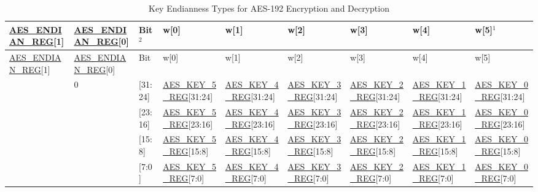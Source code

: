 \documentclass[main\_\_EN.tex]{subfiles}
\begin{document}
\begin{landscape}
\begin{tiny}
\begin{longtable}[c]
{ |p{1.5cm}|p{1.5cm}|p{0.5cm}|p{1.8cm}|p{1.8cm}|p{1.8cm}|p{1.8cm}|p{1.8cm}|p{1.8cm}|}
\caption{Key Endianness Types for AES-192 Encryption and Decryption}\label{table:AES192KeyEndian}\\
\hline
\rowcolor{lightgray}
\hyperref[regdesc:AESENDIANREG]{AES\_ENDIAN\_REG}[1]    &   \hyperref[regdesc:AESENDIANREG]{AES\_ENDIAN\_REG}[0]    &   Bit$^2$ &   w[0]    &   w[1]    &   w[2]    &   w[3]    &   w[4]    &   w[5]$^1$    \\\hline
\endfirsthead
\hline
\rowcolor{lightgray}
\hyperref[regdesc:AESENDIANREG]{AES\_ENDIAN\_REG}[1]    &   \hyperref[regdesc:AESENDIANREG]{AES\_ENDIAN\_REG}[0]    &   Bit &   w[0]    &   w[1]    &   w[2]    &   w[3]    &   w[4]    &   w[5]    \\\hline
\endhead
\endfoot
\multirow{4}{4cm}{0}    &   \multirow{4}{4cm}{0}    &   [31:24]     &   \hyperref[regdesc:AESKEYnREG]{AES\_KEY\_5\_REG}[31:24]  &   \hyperref[regdesc:AESKEYnREG]{AES\_KEY\_4\_REG}[31:24]  &   \hyperref[regdesc:AESKEYnREG]{AES\_KEY\_3\_REG}[31:24]  &   \hyperref[regdesc:AESKEYnREG]{AES\_KEY\_2\_REG}[31:24]  & \hyperref[regdesc:AESKEYnREG]{AES\_KEY\_1\_REG}[31:24]    &   \hyperref[regdesc:AESKEYnREG]{AES\_KEY\_0\_REG}[31:24]\\
\cline{3-9}
&&  [23:16]     &   \hyperref[regdesc:AESKEYnREG]{AES\_KEY\_5\_REG}[23:16]  &   \hyperref[regdesc:AESKEYnREG]{AES\_KEY\_4\_REG}[23:16]  &   \hyperref[regdesc:AESKEYnREG]{AES\_KEY\_3\_REG}[23:16]  &   \hyperref[regdesc:AESKEYnREG]{AES\_KEY\_2\_REG}[23:16]  &   \hyperref[regdesc:AESKEYnREG]{AES\_KEY\_1\_REG}[23:16]  &   \hyperref[regdesc:AESKEYnREG]{AES\_KEY\_0\_REG}[23:16]\\
\cline{3-9}
&&  [15:8]  &   \hyperref[regdesc:AESKEYnREG]{AES\_KEY\_5\_REG}[15:8]   &   \hyperref[regdesc:AESKEYnREG]{AES\_KEY\_4\_REG}[15:8]   &   \hyperref[regdesc:AESKEYnREG]{AES\_KEY\_3\_REG}[15:8]   &   \hyperref[regdesc:AESKEYnREG]{AES\_KEY\_2\_REG}[15:8]   &   \hyperref[regdesc:AESKEYnREG]{AES\_KEY\_1\_REG}[15:8]   &   \hyperref[regdesc:AESKEYnREG]{AES\_KEY\_0\_REG}[15:8]\\
\cline{3-9}
&&  [7:0]   &   \hyperref[regdesc:AESKEYnREG]{AES\_KEY\_5\_REG}[7:0]    &   \hyperref[regdesc:AESKEYnREG]{AES\_KEY\_4\_REG}[7:0]    &   \hyperref[regdesc:AESKEYnREG]{AES\_KEY\_3\_REG}[7:0]    &   \hyperref[regdesc:AESKEYnREG]{AES\_KEY\_2\_REG}[7:0]    &   \hyperref[regdesc:AESKEYnREG]{AES\_KEY\_1\_REG}[7:0]    &   \hyperref[regdesc:AESKEYnREG]{AES\_KEY\_0\_REG}[7:0]\\

\end{longtable}
\end{tiny}
\end{landscape}
\end{document}

